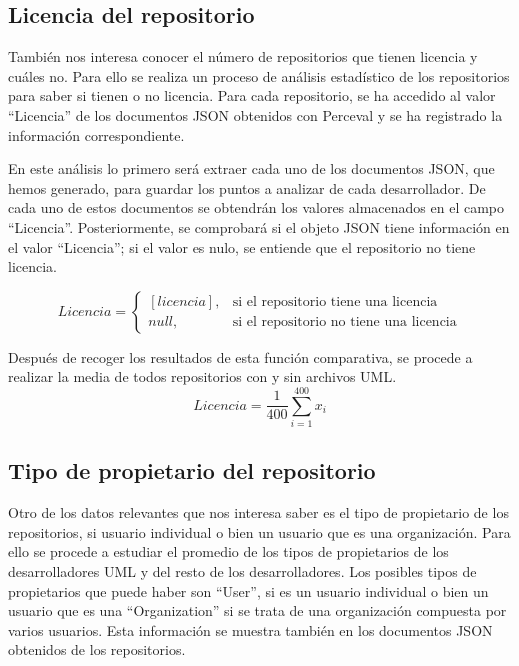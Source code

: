 \documentclass[a4paper, 12pt]{book}
\begin{document}
\subsection{Licencia del repositorio} %
\label{sec:licencia del repositorio}
También nos interesa conocer el número de repositorios que tienen licencia y cuáles no.
Para ello se realiza un proceso de análisis estadístico de los repositorios para saber si tienen o no licencia.
Para cada repositorio, se ha accedido al valor ``Licencia'' de los documentos JSON obtenidos con Perceval y se ha registrado la información correspondiente.

En este análisis lo primero será extraer cada uno de los documentos JSON, que hemos generado, para guardar los puntos a analizar de cada desarrollador.
De cada uno de estos documentos se obtendrán los valores almacenados en el campo ``Licencia''.
Posteriormente, se comprobará si el objeto JSON tiene información en el valor ``Licencia''; si el valor es nulo, se entiende que el repositorio no tiene licencia.


\begin{equation}
  Licencia =
  \begin{cases}
  [licencia], & \text{si el repositorio tiene una licencia} \\
  null, & \text{si el repositorio no tiene una licencia}
  \end{cases}
\end{equation}

Después de recoger los resultados de esta función comparativa, se procede a realizar la media de todos repositorios con y sin archivos UML.
\[{Licencia} = \frac{1}{400} \sum_{i=1}^{400} x_i\]


\subsection{Tipo de propietario del repositorio} %
\label{sec:tipo de propietario del repositorio}

Otro de los datos relevantes que nos interesa saber es el tipo de propietario de los repositorios, si usuario individual o bien un usuario que es una organización. 
Para ello se procede a estudiar el promedio de los tipos de propietarios de los desarrolladores UML y del resto de los desarrolladores.
Los posibles tipos de propietarios que puede haber son ``User'', si es un usuario individual o bien un usuario que es una ``Organization'' si se trata de una organización compuesta por varios usuarios.
Esta información se muestra también en los documentos JSON obtenidos de los repositorios.
\end{document}
